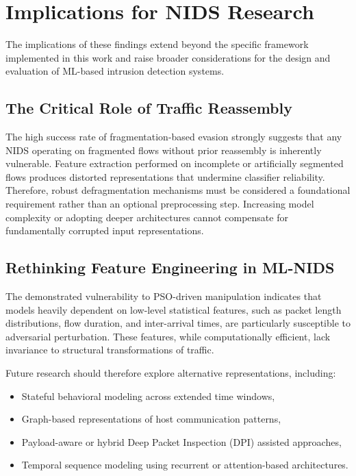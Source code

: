 \section{Implications for NIDS Research}

The implications of these findings extend beyond the specific framework implemented in this work and raise broader considerations for the design and evaluation of ML-based intrusion detection systems.

\subsection{The Critical Role of Traffic Reassembly}

The high success rate of fragmentation-based evasion strongly suggests that any NIDS operating on fragmented flows without prior reassembly is inherently vulnerable. Feature extraction performed on incomplete or artificially segmented flows produces distorted representations that undermine classifier reliability. Therefore, robust defragmentation mechanisms must be considered a foundational requirement rather than an optional preprocessing step. Increasing model complexity or adopting deeper architectures cannot compensate for fundamentally corrupted input representations.

\subsection{Rethinking Feature Engineering in ML-NIDS}

The demonstrated vulnerability to PSO-driven manipulation indicates that models heavily dependent on low-level statistical features, such as packet length distributions, flow duration, and inter-arrival times, are particularly susceptible to adversarial perturbation. These features, while computationally efficient, lack invariance to structural transformations of traffic.

Future research should therefore explore alternative representations, including:

\begin{itemize}
\item Stateful behavioral modeling across extended time windows,
\item Graph-based representations of host communication patterns,
\item Payload-aware or hybrid Deep Packet Inspection (DPI) assisted approaches,
\item Temporal sequence modeling using recurrent or attention-based architectures.
\end{itemize}


